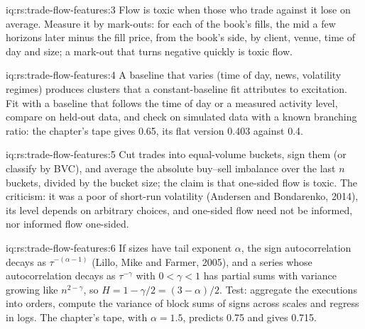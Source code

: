 \begin{solution}{iq:rs:trade-flow-features:3}
Flow is toxic when those who trade against it lose on average. Measure it by mark-outs: for each of the book's fills, the mid a few horizons
later minus the fill price, from the book's side, by client, venue, time of day and size; a mark-out that turns negative quickly is toxic
flow.
\end{solution}

\begin{solution}{iq:rs:trade-flow-features:4}
A baseline that varies (time of day, news, volatility regimes) produces clusters that a constant-baseline fit attributes to excitation. Fit
with a baseline that follows the time of day or a measured activity level, compare on held-out data, and check on simulated data with a
known branching ratio: the chapter's tape gives 0.65, its flat version 0.403 against 0.4.
\end{solution}

\begin{solution}{iq:rs:trade-flow-features:5}
Cut trades into equal-volume buckets, sign them (or classify  by BVC), and average the absolute buy--sell imbalance over the last $n$
buckets, divided by the bucket size; the claim is that one-sided flow is toxic. The criticism: it was a poor  of short-run volatility
(Andersen and Bondarenko, 2014), its level depends on arbitrary choices, and one-sided flow need not be informed, nor informed flow
one-sided.
\end{solution}

\begin{solution}{iq:rs:trade-flow-features:6}
If  sizes have tail exponent $\alpha$, the sign autocorrelation decays as $\tau^{-(\alpha-1)}$ (Lillo, Mike and Farmer, 2005), and a
series whose autocorrelation decays as $\tau^{-\gamma}$ with $0 < \gamma < 1$ has partial sums with variance growing like $n^{2 - \gamma}$,
so $H = 1 - \gamma/2 = (3 - \alpha)/2$. Test: aggregate the executions into orders, compute the variance of block sums of signs across scales
and regress in logs. The chapter's tape, with $\alpha = 1.5$, predicts 0.75 and gives 0.715.
\end{solution}
